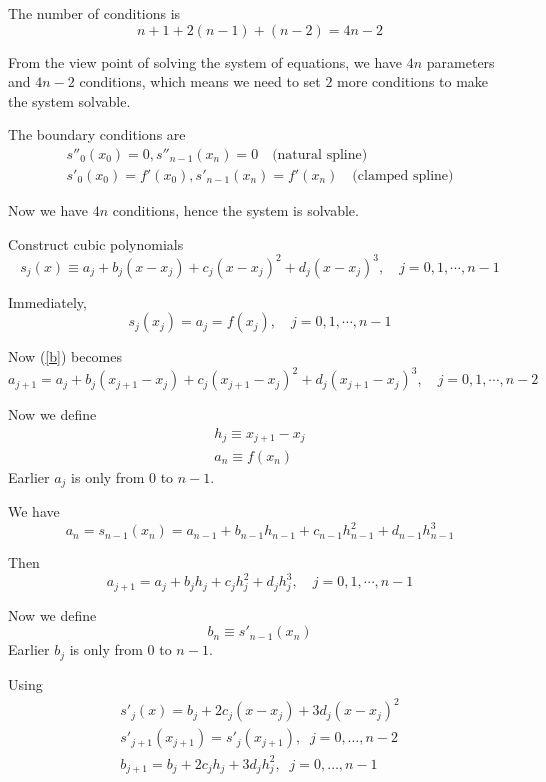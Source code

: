 The number of conditions is \[
    n + 1 + 2(n-1) + (n-2) = 4n - 2
\]

From the view point of solving the system of equations, we have $4n$ parameters and $4n-2$ conditions, which means we need to set $2$ more conditions to make the system solvable.

The boundary conditions are \begin{gather*}
    s''_0(x_0) = 0, s''_{n-1}(x_n) = 0 \quad \mbox{(natural spline)} \\
    s'_0(x_0) = f'(x_0), s'_{n-1}(x_n) = f'(x_n) \quad \mbox{(clamped spline)}
\end{gather*}

Now we have $4n$ conditions, hence the system is solvable. 

\begin{definition}
    Construct cubic polynomials
    \[
        s_j(x) \equiv a_j + b_j (x-x_j) + c_j (x-x_j)^2 + d_j (x-x_j)^3, \quad j = 0,1,\cdots,n-1
    \]
\end{definition}


Immediately, \[
    s_j(x_j) = a_j = f(x_j), \quad j = 0,1,\cdots,n-1
\]

Now (\ref{b}) becomes \[
    a_{j+1} = a_j + b_j(x_{j+1} - x_j) + c_j (x_{j+1} - x_j)^2 + d_j (x_{j+1} - x_j)^3, \quad j = 0,1,\cdots,n-2
\]

Now we define \begin{gather*}
h_j \equiv x_{j+1} - x_j \\
a_n \equiv f(x_n)
\end{gather*}
Earlier $a_j$ is only from $0$ to $n-1$.

We have \begin{equation*}
    a_n = s_{n-1}(x_n) = a_{n-1} + b_{n-1} h_{n-1} + c_{n-1} h_{n-1}^2 + d_{n-1} h_{n-1}^3
\end{equation*}

Then \begin{equation}
    a_{j+1} = a_j + b_j h_j + c_j h_j^2 + d_j h_j^3, \quad j = 0,1,\cdots,n-1 \label{eq:an}
\end{equation}

Now we define \begin{equation}
    b_n \equiv s'_{n-1}(x_n) \label{eq:bn}
\end{equation}
Earlier $b_j$ is only from $0$ to $n-1$.

Using 
\begin{gather}
    s'_j(x) = b_j+ 2c_j(x-x_j) + 3d_j(x-x_j)^2
    \nonumber \\
    s'_{j+1}(x_{j+1}) = s'_j(x_{j+1}),\; \; j = 0, \ldots, n-2  
    \nonumber \\
    b_{j+1} = b_j+ 2c_j h_j + 3d_j h_j^2, \; \;
    j = 0, \ldots, n-1
    \label{bj+1}
\end{gather}

